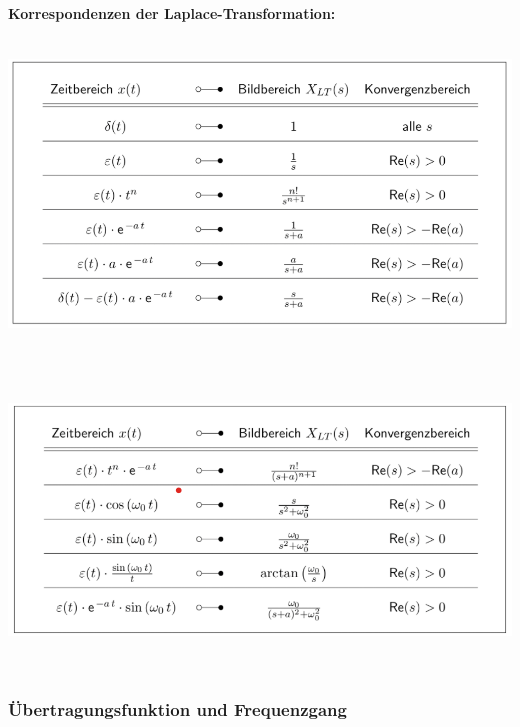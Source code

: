 \documentclass[12pt,a4paper]{scrartcl}
\begin{document}
  \noindent \textbf{Korrespondenzen der Laplace-Transformation:} \\
  \includegraphics[height = 9cm]{Pictures/KorrespondenzLT.png}\\
  \includegraphics[height = 8cm]{Pictures/KorrespondenzLT2.png}

  \subsubsection{Übertragungsfunktion und Frequenzgang}
  \label{sec:sub:sub:uebertragungsfunktion-und-frequenzgang}
\end{document}
